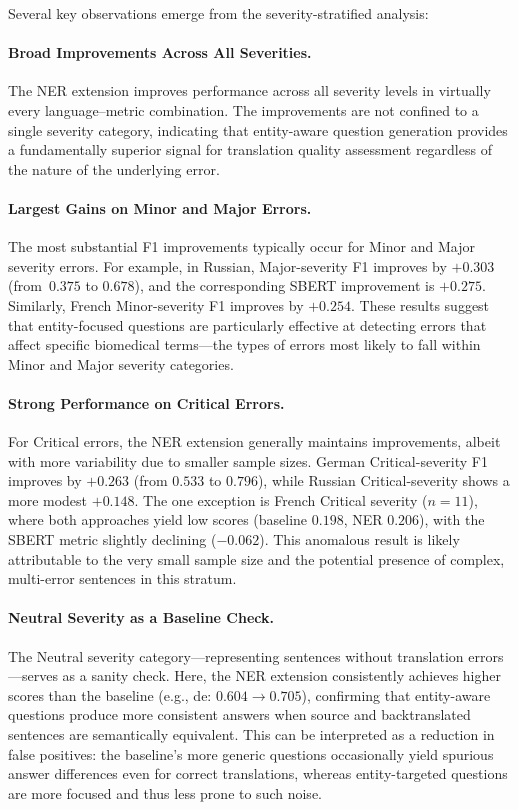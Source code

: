 Several key observations emerge from the severity-stratified analysis:

\paragraph{Broad Improvements Across All Severities.}
The NER extension improves performance across all severity levels in virtually every language--metric combination. The improvements are not confined to a single severity category, indicating that entity-aware question generation provides a fundamentally superior signal for translation quality assessment regardless of the nature of the underlying error.

\paragraph{Largest Gains on Minor and Major Errors.}
The most substantial F1 improvements typically occur for Minor and Major severity errors. For example, in Russian, Major-severity F1 improves by $+0.303$ (from~$0.375$ to $0.678$), and the corresponding SBERT improvement is $+0.275$. Similarly, French Minor-severity F1 improves by $+0.254$. These results suggest that entity-focused questions are particularly effective at detecting errors that affect specific biomedical terms---the types of errors most likely to fall within Minor and Major severity categories.

\paragraph{Strong Performance on Critical Errors.}
For Critical errors, the NER extension generally maintains improvements, albeit with more variability due to smaller sample sizes. German Critical-severity F1 improves by $+0.263$ (from $0.533$ to $0.796$), while Russian Critical-severity shows a more modest $+0.148$. The one exception is French Critical severity ($n = 11$), where both approaches yield low scores (baseline $0.198$, NER $0.206$), with the SBERT metric slightly declining ($-0.062$). This anomalous result is likely attributable to the very small sample size and the potential presence of complex, multi-error sentences in this stratum.

\paragraph{Neutral Severity as a Baseline Check.}
The Neutral severity category---representing sentences without translation errors---serves as a sanity check. Here, the NER extension consistently achieves higher scores than the baseline (e.g., de: $0.604 \rightarrow 0.705$), confirming that entity-aware questions produce more consistent answers when source and backtranslated sentences are semantically equivalent. This can be interpreted as a reduction in false positives: the baseline's more generic questions occasionally yield spurious answer differences even for correct translations, whereas entity-targeted questions are more focused and thus less prone to such noise.

